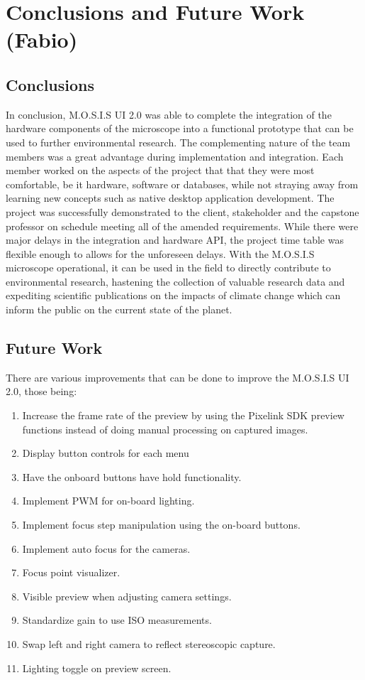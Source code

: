 \section{Conclusions and Future Work (Fabio)}
\subsection{Conclusions}
In conclusion, M.O.S.I.S UI 2.0 was able to complete the integration of the hardware components of the microscope into a functional prototype that can be used to further environmental research. The complementing nature of the team members was a great advantage during implementation and integration. Each member worked on the aspects of the project that that they were most comfortable, be it hardware, software or databases, while not straying away from learning new concepts such as native desktop application development. The project was successfully demonstrated to the client, stakeholder and the capstone professor on schedule meeting all of the amended requirements. While there were major delays in the integration and hardware API, the project time table was flexible enough to allows for the unforeseen delays. With the M.O.S.I.S microscope operational, it can be used in the field to directly contribute to environmental research, hastening the collection of valuable research data and expediting scientific publications on the impacts of climate change which can inform the public on the current state of the planet.

\subsection{Future Work}
There are various improvements that can be done to improve the M.O.S.I.S UI 2.0, those being:
\begin{enumerate}
	\item Increase the frame rate of the preview by using the Pixelink SDK preview functions instead of doing manual processing on captured images.
	\item Display button controls for each menu
	\item Have the onboard buttons have hold functionality.
	\item Implement PWM for on-board lighting.
	\item Implement focus step manipulation using the on-board buttons.
	\item Implement auto focus for the cameras.
	\item Focus point visualizer.
	\item Visible preview when adjusting camera settings.
	\item Standardize gain to use ISO measurements.
	\item Swap left and right camera to reflect stereoscopic capture.
	\item Lighting toggle on preview screen.
\end{enumerate}
